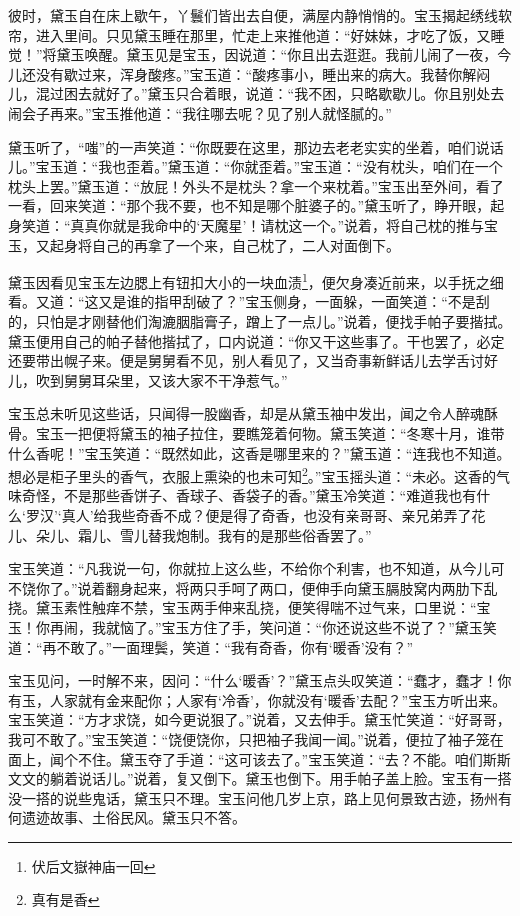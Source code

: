 \documentclass[12pt,oneside]{book}
\begin{document}
彼时，黛玉自在床上歇午，丫鬟们皆出去自便，满屋内静悄悄的。宝玉揭起绣线软帘，进入里间。只见黛玉睡在那里，忙走上来推他道：“好妹妹，才吃了饭，又睡觉！”将黛玉唤醒。黛玉见是宝玉，因说道：“你且出去逛逛。我前儿闹了一夜，今儿还没有歇过来，浑身酸疼。”宝玉道：“酸疼事小，睡出来的病大。我替你解闷儿，混过困去就好了。”黛玉只合着眼，说道：“我不困，只略歇歇儿。你且别处去闹会子再来。”宝玉推他道：“我往哪去呢？见了别人就怪腻的。”

黛玉听了，“嗤”的一声笑道：“你既要在这里，那边去老老实实的坐着，咱们说话儿。”宝玉道：“我也歪着。”黛玉道：“你就歪着。”宝玉道：“没有枕头，咱们在一个枕头上罢。”黛玉道：“放屁！外头不是枕头？拿一个来枕着。”宝玉出至外间，看了一看，回来笑道：“那个我不要，也不知是哪个脏婆子的。”黛玉听了，睁开眼，起身笑道：“真真你就是我命中的‘天魔星’！请枕这一个。”说着，将自己枕的推与宝玉，又起身将自己的再拿了一个来，自己枕了，二人对面倒下。

黛玉因看见宝玉左边腮上有钮扣大小的一块血渍\footnote{伏后文嶽神庙一回}，便欠身凑近前来，以手抚之细看。又道：“这又是谁的指甲刮破了？”宝玉侧身，一面躲，一面笑道：“不是刮的，只怕是才刚替他们淘漉胭脂膏子，蹭上了一点儿。”说着，便找手帕子要揩拭。黛玉便用自己的帕子替他揩拭了，口内说道：“你又干这些事了。干也罢了，必定还要带出幌子来。便是舅舅看不见，别人看见了，又当奇事新鲜话儿去学舌讨好儿，吹到舅舅耳朵里，又该大家不干净惹气。”

宝玉总未听见这些话，只闻得一股幽香，却是从黛玉袖中发出，闻之令人醉魂酥骨。宝玉一把便将黛玉的袖子拉住，要瞧笼着何物。黛玉笑道：“冬寒十月，谁带什么香呢！”宝玉笑道：“既然如此，这香是哪里来的？”黛玉道：“连我也不知道。想必是柜子里头的香气，衣服上熏染的也未可知\footnote{真有是香}。”宝玉摇头道：“未必。这香的气味奇怪，不是那些香饼子、香球子、香袋子的香。”黛玉冷笑道：“难道我也有什么‘罗汉’‘真人’给我些奇香不成？便是得了奇香，也没有亲哥哥、亲兄弟弄了花儿、朵儿、霜儿、雪儿替我炮制。我有的是那些俗香罢了。”

宝玉笑道：“凡我说一句，你就拉上这么些，不给你个利害，也不知道，从今儿可不饶你了。”说着翻身起来，将两只手呵了两口，便伸手向黛玉膈肢窝内两肋下乱挠。黛玉素性触痒不禁，宝玉两手伸来乱挠，便笑得喘不过气来，口里说：“宝玉！你再闹，我就恼了。”宝玉方住了手，笑问道：“你还说这些不说了？”黛玉笑道：“再不敢了。”一面理鬓，笑道：“我有奇香，你有‘暖香’没有？”

宝玉见问，一时解不来，因问：“什么‘暖香’？”黛玉点头叹笑道：“蠢才，蠢才！你有玉，人家就有金来配你；人家有‘冷香’，你就没有‘暖香’去配？”宝玉方听出来。宝玉笑道：“方才求饶，如今更说狠了。”说着，又去伸手。黛玉忙笑道：“好哥哥，我可不敢了。”宝玉笑道：“饶便饶你，只把袖子我闻一闻。”说着，便拉了袖子笼在面上，闻个不住。黛玉夺了手道：“这可该去了。”宝玉笑道：“去？不能。咱们斯斯文文的躺着说话儿。”说着，复又倒下。黛玉也倒下。用手帕子盖上脸。宝玉有一搭没一搭的说些鬼话，黛玉只不理。宝玉问他几岁上京，路上见何景致古迹，扬州有何遗迹故事、土俗民风。黛玉只不答。
\end{document}
